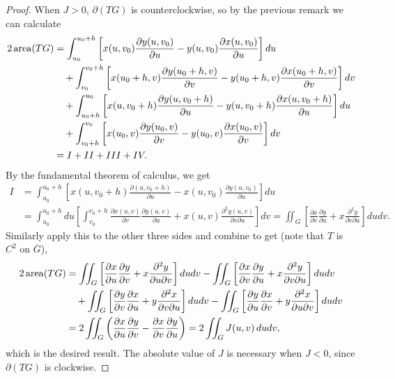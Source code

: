 \begin{proof}
  When $J > 0$, $\partial(TG)$ is counterclockwise, so by the
  previous remark we can calculate
  \begin{align*}
    2 \operatorname{area}(TG)
    &= \int_{u_0}^{u_0 + h} \left[x(u, v_0) \frac{\partial y(u, v_0)}{\partial u} - y(u, v_0) \frac{\partial x(u, v_0)}{\partial u}\right] du \\
    &\quad + \int_{v_0}^{v_0 + h} \left[x(u_0 + h, v) \frac{\partial y(u_0 + h, v)}{\partial v} - y(u_0 + h, v) \frac{\partial x(u_0 + h, v)}{\partial v}\right] dv \\
    &\quad +\int_{u_0 + h}^{u_0} \left[x(u, v_0 + h) \frac{\partial y(u, v_0 + h)}{\partial u} - y(u, v_0 + h) \frac{\partial x(u, v_0 + h)}{\partial u}\right] du \\
    &\quad + \int_{v_0 + h}^{v_0} \left[x(u_0, v) \frac{\partial y(u_0, v)}{\partial v} - y(u_0, v) \frac{\partial x(u_0, v)}{\partial v}\right] dv \\
    &= I + II + III + IV.
  \end{align*}
  By the fundamental theorem of calculus, we get
  \begin{align*}
    I
    &= \int_{u_0}^{u_0 + h}
    \left[x(u, v_0 + h) \frac{\partial(u, v_0 + h)}{\partial u} - x(u, v_0) \frac{\partial y(u, v_0)}{\partial u}\right] du \\
    &= \int_{u_0}^{u_0 + h} du \left[\int_{v_0}^{v_0 + h} \frac{\partial x(u, v)}{\partial v} \frac{\partial y(u, v)}{\partial u} + x(u, v) \frac{\partial^2 y(u, v)}{\partial v \partial u}\right] dv
    = \iint_G \left[\frac{\partial x}{\partial v} \frac{\partial y}{\partial u} + x \frac{\partial^2 y}{\partial v \partial u}\right] dudv.
  \end{align*}
  Similarly apply this to the other three sides and
  combine to get (note that $T$ is $C^2$ on $\overline{G}$),
  \begin{align*}
    2\operatorname{area}(TG)
    &= \iint_G \left[\frac{\partial x}{\partial u}\frac{\partial y}{\partial v} + x \frac{\partial^2 y}{\partial u \partial v}\right] dudv
    - \iint_G \left[\frac{\partial x}{\partial v}\frac{\partial y}{\partial u} + x \frac{\partial^2 y}{\partial v \partial u}\right] dudv \\
    &\quad + \iint_G \left[\frac{\partial y}{\partial v}\frac{\partial x}{\partial u} + y \frac{\partial^2 x}{\partial v \partial u}\right] dudv
    - \iint_G \left[\frac{\partial y}{\partial u}\frac{\partial x}{\partial v} + y \frac{\partial^2 x}{\partial u \partial v}\right] dudv \\
    &= 2 \iint_G \left(\frac{\partial x}{\partial u} \frac{\partial y}{\partial v} - \frac{\partial x}{\partial v} \frac{\partial y}{\partial u}\right)
    = 2 \iint_G J(u, v)\, dudv,
  \end{align*}
  which is the desired result. The absolute
  value of $J$ is necessary when $J < 0$, since
  $\partial(TG)$ is clockwise.
\end{proof}

